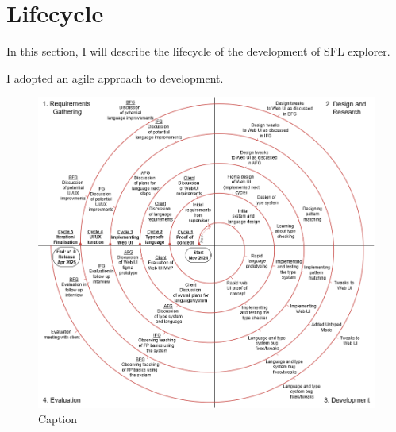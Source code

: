 \chapter{Lifecycle}
In this section, I will describe the lifecycle of the development of SFL explorer.



I adopted an agile approach to development. 


\begin{figure}
    \centering
    \includegraphics[width=\linewidth]{images/spiral2.drawio.png}
    \caption{Caption}
    \label{fig:enter-label}
\end{figure}